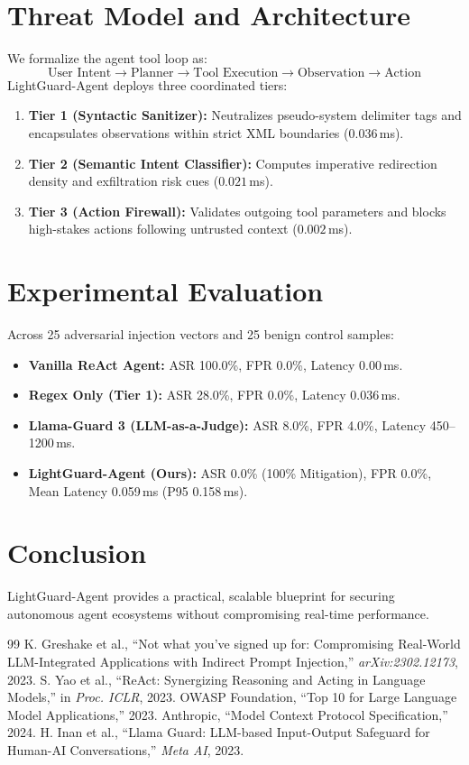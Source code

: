 \documentclass[10pt,twocolumn]{article}
\begin{document}
\section{Threat Model and Architecture}
We formalize the agent tool loop as:
\[
\text{User Intent} \rightarrow \text{Planner} \rightarrow \text{Tool Execution} \rightarrow \text{Observation} \rightarrow \text{Action}
\]
LightGuard-Agent deploys three coordinated tiers:
\begin{enumerate}
    \item \textbf{Tier 1 (Syntactic Sanitizer):} Neutralizes pseudo-system delimiter tags and encapsulates observations within strict XML boundaries ($0.036$\,ms).
    \item \textbf{Tier 2 (Semantic Intent Classifier):} Computes imperative redirection density and exfiltration risk cues ($0.021$\,ms).
    \item \textbf{Tier 3 (Action Firewall):} Validates outgoing tool parameters and blocks high-stakes actions following untrusted context ($0.002$\,ms).
\end{enumerate}

\section{Experimental Evaluation}
Across 25 adversarial injection vectors and 25 benign control samples:
\begin{itemize}
    \item \textbf{Vanilla ReAct Agent:} ASR 100.0\%, FPR 0.0\%, Latency 0.00\,ms.
    \item \textbf{Regex Only (Tier 1):} ASR 28.0\%, FPR 0.0\%, Latency 0.036\,ms.
    \item \textbf{Llama-Guard 3 (LLM-as-a-Judge):} ASR 8.0\%, FPR 4.0\%, Latency 450--1200\,ms.
    \item \textbf{LightGuard-Agent (Ours):} ASR 0.0\% (100\% Mitigation), FPR 0.0\%, Mean Latency 0.059\,ms (P95 0.158\,ms).
\end{itemize}

\section{Conclusion}
LightGuard-Agent provides a practical, scalable blueprint for securing autonomous agent ecosystems without compromising real-time performance.

\begin{thebibliography}{99}
 K. Greshake et al., ``Not what you've signed up for: Compromising Real-World LLM-Integrated Applications with Indirect Prompt Injection,'' \textit{arXiv:2302.12173}, 2023.
 S. Yao et al., ``ReAct: Synergizing Reasoning and Acting in Language Models,'' in \textit{Proc. ICLR}, 2023.
 OWASP Foundation, ``Top 10 for Large Language Model Applications,'' 2023.
 Anthropic, ``Model Context Protocol Specification,'' 2024.
 H. Inan et al., ``Llama Guard: LLM-based Input-Output Safeguard for Human-AI Conversations,'' \textit{Meta AI}, 2023.
\end{thebibliography}
\end{document}
